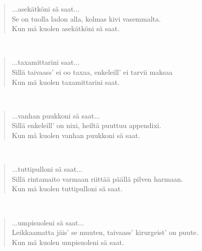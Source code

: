 \noindent\begin{minipage}{\linewidth}
\begin{verse}
	...asekätköni sä saat...\\
	Se on tuolla ladon alla, kolmas kivi vasemmalta.\\
	Kun mä kuolen asekätköni sä saat.\\
\end{verse}
\end{minipage}\\[10pt]
\noindent\begin{minipage}{\linewidth}
\begin{verse}
	...taxamittarini saat...\\
	Sillä taivaass' ei oo taxaa, enkeleill' ei tarvii maksaa\\
	Kun mä kuolen taxamittarini saat.\\
\end{verse}
\end{minipage}\\[10pt]
\noindent\begin{minipage}{\linewidth}
\begin{verse}
	...vanhan puukkoni sä saat...\\
	Sillä enkeleill' on nixi, heiltä puuttuu appendixi.\\
	Kun mä kuolen vanhan puukkoni sä saat.\\
\end{verse}
\end{minipage}\\[10pt]
\noindent\begin{minipage}{\linewidth}
\begin{verse}
	...tuttipulloni sä saat...\\
	Sillä rintamaito varmaan riittää päällä pilven harmaan.\\
	Kun mä kuolen tuttipulloni sä saat.\\
\end{verse}
\end{minipage}\\[10pt]
\noindent\begin{minipage}{\linewidth}
\begin{verse}
	...umpisuoleni sä saat...\\
	Leikkaamatta jäis' se muuten, taivaass' kirurgeist' on puute.\\
	Kun mä kuolen umpisuoleni sä saat.\\
\end{verse}
\end{minipage}\\[10pt]
